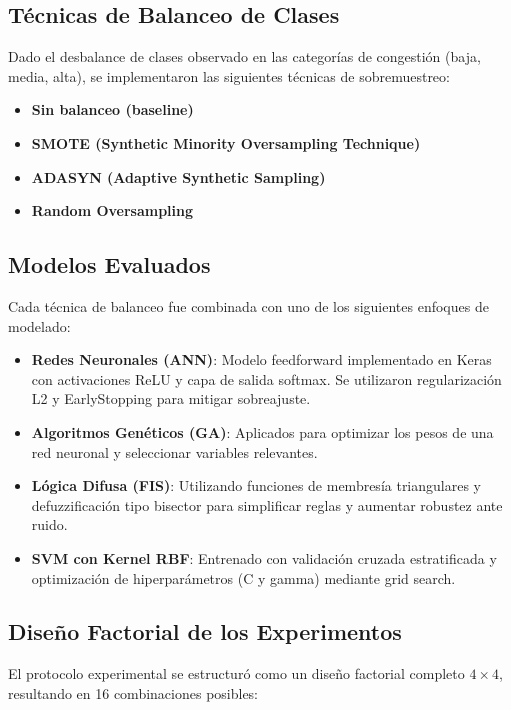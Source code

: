 \documentclass{svproc} %
\begin{document}
\subsection{Técnicas de Balanceo de Clases}

Dado el desbalance de clases observado en las categorías de congestión (baja, media, alta), se implementaron las siguientes técnicas de sobremuestreo:

\begin{itemize}
    \item \textbf{Sin balanceo (baseline)}
    \item \textbf{SMOTE (Synthetic Minority Oversampling Technique)}
    \item \textbf{ADASYN (Adaptive Synthetic Sampling)}
    \item \textbf{Random Oversampling}
\end{itemize}

\subsection{Modelos Evaluados}

Cada técnica de balanceo fue combinada con uno de los siguientes enfoques de modelado:

\begin{itemize}
    \item \textbf{Redes Neuronales (ANN)}: Modelo feedforward implementado en Keras con activaciones ReLU y capa de salida softmax. Se utilizaron regularización L2 y EarlyStopping para mitigar sobreajuste.
    \item \textbf{Algoritmos Genéticos (GA)}: Aplicados para optimizar los pesos de una red neuronal y seleccionar variables relevantes.
    \item \textbf{Lógica Difusa (FIS)}: Utilizando funciones de membresía triangulares y defuzzificación tipo bisector para simplificar reglas y aumentar robustez ante ruido.
    \item \textbf{SVM con Kernel RBF}: Entrenado con validación cruzada estratificada y optimización de hiperparámetros (C y gamma) mediante grid search.
\end{itemize}

\subsection{Diseño Factorial de los Experimentos}

El protocolo experimental se estructuró como un diseño factorial completo \( 4 \times 4 \), resultando en 16 combinaciones posibles:
\end{document}
